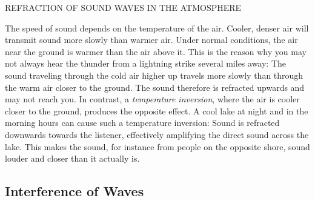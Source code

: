 \documentclass[11pt]{NSF}
\begin{document}
REFRACTION OF SOUND WAVES IN THE ATMOSPHERE

The speed of sound depends on the temperature of the air. Cooler, denser air
will transmit sound more slowly than warmer air. Under normal conditions, the
air near the ground is warmer than the air above it. This is the reason why you
may not always hear the thunder from a lightning strike several miles away: The
sound traveling through the cold air higher up travels more slowly than through
the warm air closer to the ground. The sound therefore is refracted upwards and
may not reach you. In contrast, a {\em temperature inversion}, where the air is
cooler closer to the ground, produces the opposite effect. A cool lake at night
and in the morning hours can cause such a temperature inversion: Sound is
refracted downwards towards the listener, effectively amplifying the direct
sound across the lake. This makes the sound, for instance from people on the
opposite shore, sound louder and closer than it actually is.

\subsection{Interference of Waves}
\end{document}
